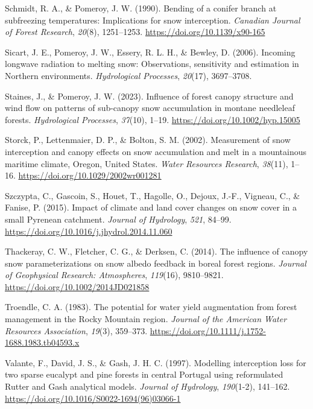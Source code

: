 \documentclass[
]{agujournal2019}
\newlength{\cslhangindent}
\newenvironment{CSLReferences}[2] %
 {\begin{list}{}{%
  \setlength{\itemindent}{0pt}
  \setlength{\leftmargin}{0pt}
  \setlength{\parsep}{0pt}
  \ifodd #1
   \setlength{\leftmargin}{\cslhangindent}
   \setlength{\itemindent}{-1\cslhangindent}
  \fi
  \setlength{\itemsep}{#2\baselineskip}}}
 {\end{list}}
\begin{document}
\begin{CSLReferences}{1}{0}
Schmidt, R. A., \& Pomeroy, J. W. (1990). Bending of a conifer branch at
subfreezing temperatures: Implications for snow interception.
\emph{Canadian Journal of Forest Research}, \emph{20}(8), 1251--1253.
\url{https://doi.org/10.1139/x90-165}

Sicart, J. E., Pomeroy, J. W., Essery, R. L. H., \& Bewley, D. (2006).
Incoming longwave radiation to melting snow: Observations, sensitivity
and estimation in {Northern} environments. \emph{Hydrological
Processes}, \emph{20}(17), 3697--3708.

Staines, J., \& Pomeroy, J. W. (2023). Influence of forest canopy
structure and wind flow on patterns of sub-canopy snow accumulation in
montane needleleaf forests. \emph{Hydrological Processes},
\emph{37}(10), 1--19. \url{https://doi.org/10.1002/hyp.15005}

Storck, P., Lettenmaier, D. P., \& Bolton, S. M. (2002). Measurement of
snow interception and canopy effects on snow accumulation and melt in a
mountainous maritime climate, {Oregon}, {United States}. \emph{Water
Resources Research}, \emph{38}(11), 1--16.
\url{https://doi.org/10.1029/2002wr001281}

Szczypta, C., Gascoin, S., Houet, T., Hagolle, O., Dejoux, J.-F.,
Vigneau, C., \& Fanise, P. (2015). Impact of climate and land cover
changes on snow cover in a small {Pyrenean} catchment. \emph{Journal of
Hydrology}, \emph{521}, 84--99.
\url{https://doi.org/10.1016/j.jhydrol.2014.11.060}

Thackeray, C. W., Fletcher, C. G., \& Derksen, C. (2014). The influence
of canopy snow parameterizations on snow albedo feedback in boreal
forest regions. \emph{Journal of Geophysical Research: Atmospheres},
\emph{119}(16), 9810--9821. \url{https://doi.org/10.1002/2014JD021858}

Troendle, C. A. (1983). The potential for water yield augmentation from
forest management in the {Rocky Mountain} region. \emph{Journal of the
American Water Resources Association}, \emph{19}(3), 359--373.
\url{https://doi.org/10.1111/j.1752-1688.1983.tb04593.x}

Valante, F., David, J. S., \& Gash, J. H. C. (1997). Modelling
interception loss for two sparse eucalypt and pine forests in central
{Portugal} using reformulated {Rutter} and {Gash} analytical models.
\emph{Journal of Hydrology}, \emph{190}(1-2), 141--162.
\url{https://doi.org/10.1016/S0022-1694(96)03066-1}


\end{CSLReferences}
\end{document}
